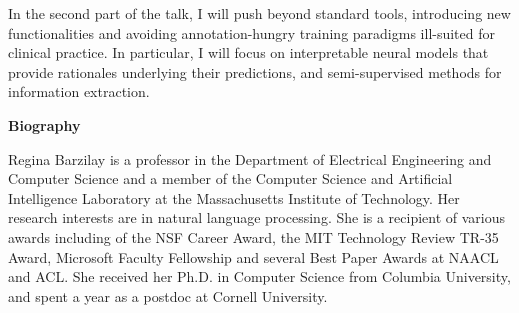 In the second part of the talk, I will push beyond standard tools, 
introducing new functionalities and avoiding annotation-hungry training 
paradigms ill-suited for clinical practice. In particular, I will focus on 
interpretable neural models that provide rationales underlying their 
predictions, and semi-supervised methods for information extraction.

\vfill
\noindent
{\bfseries Biography}

Regina Barzilay is a professor in the Department of Electrical Engineering 
and Computer Science and a member of the Computer Science and Artificial 
Intelligence Laboratory at the Massachusetts Institute of Technology. Her 
research interests are in natural language processing. She is a recipient 
of various awards including of the NSF Career Award, the MIT Technology 
Review TR-35 Award, Microsoft Faculty Fellowship and several Best Paper 
Awards at NAACL and ACL. She received her Ph.D. in Computer Science from 
Columbia University, and spent a year as a postdoc at Cornell University.
\newpage
